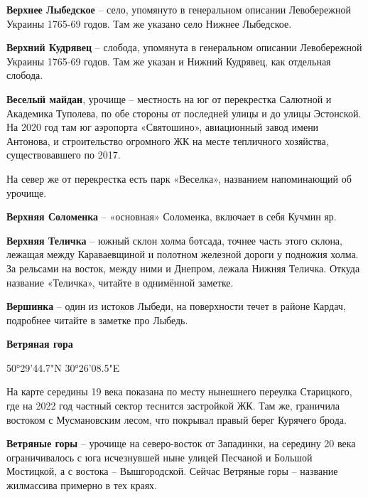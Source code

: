 \textbf{Верхнее Лыбедское} – село, упомянуто в генеральном описании Левобережной Украины 1765-69 годов. Там же указано село Нижнее Лыбедское.\\

\medskip

\textbf{Верхний Кудрявец} – слобода, упомянута в генеральном описании Левобережной Украины 1765-69 годов. Там же указан и Нижний Кудрявец, как отдельная слобода.\\

\medskip

\textbf{Веселый майдан}, урочище – местность на юг от перекрестка Салютной и Академика Туполева, по обе стороны от последней улицы и до улицы Эстонской. На 2020 год там юг аэропорта «Святошино», авиационный завод имени Антонова, и строительство огромного ЖК на месте тепличного хозяйства, существовавшего по 2017. 

На север же от перекрестка есть парк «Веселка», названием напоминающий об урочище.\\

\medskip

\textbf{Верхняя Соломенка} – «основная» Соломенка, включает в себя Кучмин яр.\\

\medskip

\textbf{Верхняя Теличка} – южный склон холма ботсада, точнее часть этого склона, лежащая между Караваевщиной и полотном железной дороги у подножия холма. За рельсами на восток, между ними и Днепром, лежала Нижняя Теличка. Откуда название «Теличка», читайте в однимённой заметке.\\

\medskip


\textbf{Вершинка} – один из истоков Лыбеди, на поверхности течет в районе Кардач, подробнее читайте в заметке про Лыбедь.\\ 

\medskip

\textbf{Ветряная гора}

50°29'44.7"N 30°26'08.5"E

На карте середины 19 века показана по месту нынешнего переулка Старицкого, где на 2022 год частный сектор теснится застройкой ЖК. Там же, граничила востоком с Мусмановским лесом, что покрывал правый берег Курячего брода.\\

\medskip

\textbf{Ветряные горы} – урочище на северо-восток от Западинки, на середину 20 века ограничивалось с юга исчезнувшей ныне улицей Песчаной и Большой Мостицкой, а с востока – Вышгородской. Сейчас Ветряные горы – название жилмассива примерно в тех краях.\\

